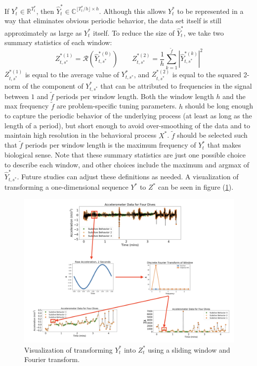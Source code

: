 If $Y^*_t \in \mathbb{R}^{T^*_t}$, then $\hat{Y}_t^* \in \mathbb{C}^{\lfloor T^*_t / h \rfloor \times h}$. Although this allows $Y^*_t$ to be represented in a way that eliminates obvious periodic behavior, the data set itself is still approximately as large as $Y^*_t$ itself. To reduce the size of $\hat{Y}^*_t$, we take two summary statistics of each window:
%
$$Z_{t,s^*}^{*(1)} = \mathcal{R}\left(\hat{Y}^{*(0)}_{t,s^*}\right) \qquad Z_{t,s^*}^{*(2)} = \frac{1}{h}\sum_{k=1}^{\tilde{f}}|\hat{Y}^{*(k)}_{t,s^*}|^2$$
%
$Z_{t,s^*}^{*(1)}$ is equal to the average value of $Y_{t,s^*}^*$, and $Z_{t,s^*}^{*(2)}$ is equal to the squared 2-norm of the component of $Y_{t,s^*}^*$ that can be attributed to frequencies in the signal between $1$ and $\tilde{f}$ periods per window length. Both the window length $h$ and the max frequency $\tilde{f}$ are problem-specific tuning parameters. $h$ should be long enough to capture the periodic behavior of the underlying process (at least as long as the length of a period), but short enough to avoid over-smoothing of the data and to maintain high resolution in the behavioral process $X^*$. $\tilde{f}$ should be selected such that $\tilde{f}$ periods per window length is the maximum frequency of $Y_t^*$ that makes biological sense. Note that these summary statistics are just one possible choice to describe each window, and other choices include the maximum and argmax of $\hat Y^*_{t,s^*}$. Future studies can adjust these definitions as needed. A visualization of transforming a one-dimensional sequence $Y^*$ to $Z^*$ can be seen in figure (\ref{fig:fourier_example}).

\begin{figure}[ht]
	\centering
	\includegraphics[width=5in]{../Plots/fourier_transform.png}
	\caption{Visualization of transforming $Y^*_t$ into $Z^*_t$ using a sliding window and Fourier transform.}
	\label{fig:fourier_example}
\end{figure}

